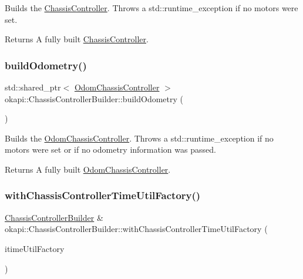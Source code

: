 Builds the \mbox{\hyperlink{classokapi_1_1ChassisController}{Chassis\+Controller}}. Throws a std\+::runtime\+\_\+exception if no motors were set.

\begin{DoxyReturn}{Returns}
A fully built \mbox{\hyperlink{classokapi_1_1ChassisController}{Chassis\+Controller}}. 
\end{DoxyReturn}
\mbox{\label{classokapi_1_1ChassisControllerBuilder_a9c631ea817466483aa2cfcb886f6d892}} 
\subsubsection{\texorpdfstring{buildOdometry()}{buildOdometry()}}
{\footnotesize\ttfamily std\+::shared\+\_\+ptr$<$ \mbox{\hyperlink{classokapi_1_1OdomChassisController}{Odom\+Chassis\+Controller}} $>$ okapi\+::\+Chassis\+Controller\+Builder\+::build\+Odometry (\begin{DoxyParamCaption}{ }\end{DoxyParamCaption})}

Builds the \mbox{\hyperlink{classokapi_1_1OdomChassisController}{Odom\+Chassis\+Controller}}. Throws a std\+::runtime\+\_\+exception if no motors were set or if no odometry information was passed.

\begin{DoxyReturn}{Returns}
A fully built \mbox{\hyperlink{classokapi_1_1OdomChassisController}{Odom\+Chassis\+Controller}}. 
\end{DoxyReturn}
\mbox{\label{classokapi_1_1ChassisControllerBuilder_a1ca2919cbd6fa19b34aeaa1eeee98462}} 
\subsubsection{\texorpdfstring{withChassisControllerTimeUtilFactory()}{withChassisControllerTimeUtilFactory()}}
{\footnotesize\ttfamily \mbox{\hyperlink{classokapi_1_1ChassisControllerBuilder}{Chassis\+Controller\+Builder}} \& okapi\+::\+Chassis\+Controller\+Builder\+::with\+Chassis\+Controller\+Time\+Util\+Factory (\begin{DoxyParamCaption}\item[{const \mbox{\hyperlink{classokapi_1_1TimeUtilFactory}{Time\+Util\+Factory}} \&}]{itime\+Util\+Factory }\end{DoxyParamCaption})}

